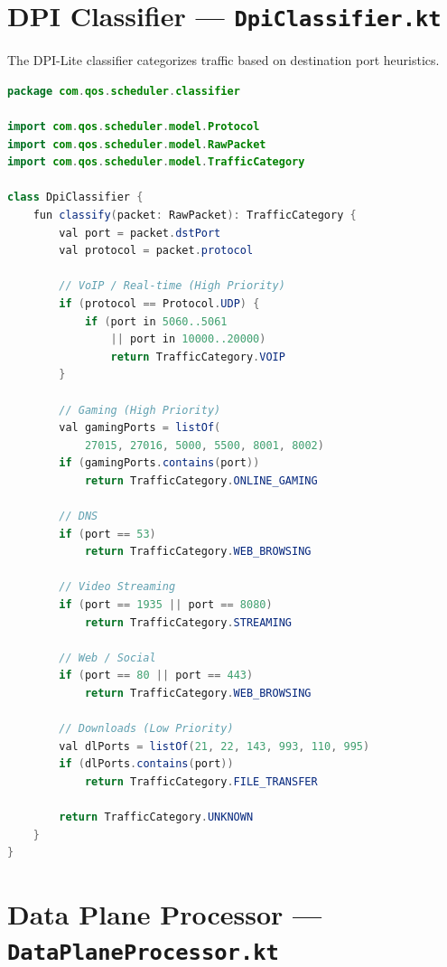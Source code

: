 
\section{DPI Classifier --- \texttt{DpiClassifier.kt}}
\label{app:dpi}

The DPI-Lite classifier categorizes traffic based on destination port heuristics.

\begin{lstlisting}[language=Java, caption={DpiClassifier.kt --- Port-based traffic classifier}, label={lst:dpi}]
package com.qos.scheduler.classifier

import com.qos.scheduler.model.Protocol
import com.qos.scheduler.model.RawPacket
import com.qos.scheduler.model.TrafficCategory

class DpiClassifier {
    fun classify(packet: RawPacket): TrafficCategory {
        val port = packet.dstPort
        val protocol = packet.protocol

        // VoIP / Real-time (High Priority)
        if (protocol == Protocol.UDP) {
            if (port in 5060..5061
                || port in 10000..20000)
                return TrafficCategory.VOIP
        }

        // Gaming (High Priority)
        val gamingPorts = listOf(
            27015, 27016, 5000, 5500, 8001, 8002)
        if (gamingPorts.contains(port))
            return TrafficCategory.ONLINE_GAMING

        // DNS
        if (port == 53)
            return TrafficCategory.WEB_BROWSING

        // Video Streaming
        if (port == 1935 || port == 8080)
            return TrafficCategory.STREAMING

        // Web / Social
        if (port == 80 || port == 443)
            return TrafficCategory.WEB_BROWSING

        // Downloads (Low Priority)
        val dlPorts = listOf(21, 22, 143, 993, 110, 995)
        if (dlPorts.contains(port))
            return TrafficCategory.FILE_TRANSFER

        return TrafficCategory.UNKNOWN
    }
}
\end{lstlisting}


\section{Data Plane Processor --- \texttt{DataPlaneProcessor.kt}}
\label{app:dataplane}

